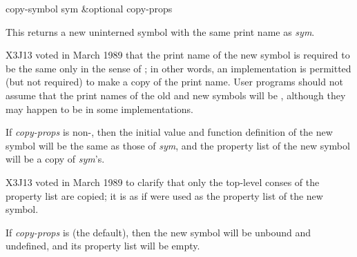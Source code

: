 \begin{defun}[Function]
copy-symbol sym &optional copy-props

This returns a new uninterned symbol with the same print name
as \emph{sym}.

\begin{newer}
X3J13 voted in March 1989 
that the print name of the new symbol is required to be
the same only in the sense of ; in other words,
an implementation is permitted (but not required)
to make a copy of the print name.
User programs should not assume that the print names of the old and new symbols
will be , although they may happen to be  in some implementations.
\end{newer}

If \emph{copy-props} is non-{\nil}, then the initial
value and function definition of the new symbol will
be the same as those of \emph{sym}, and the property list of
the new symbol will be a copy of \emph{sym}'s.

\begin{newer}
X3J13 voted in March 1989 
to clarify that only the top-level conses of the
property list are copied; it is as if 
were used as the property list of the new symbol.
\end{newer}

If \emph{copy-props}
is {\nil} (the default), then the new symbol will be unbound and undefined, and
its property list will be empty.
\end{defun}

